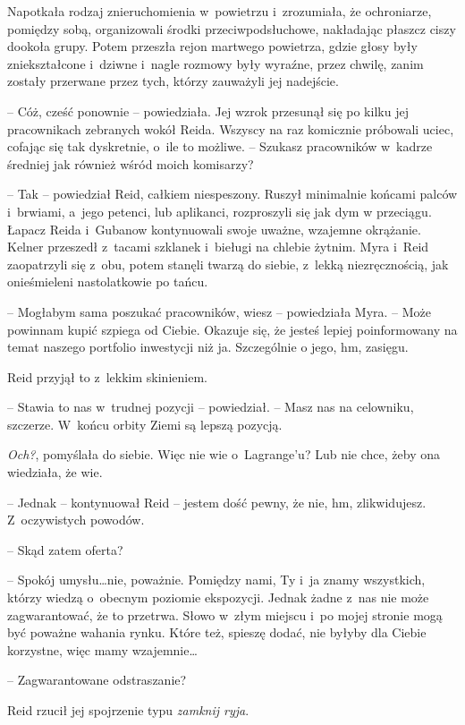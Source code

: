 \documentclass[oneside,polish,11pt,sfheadings]{mwbk}
\begin{document}
Napotkała rodzaj znieruchomienia w~powietrzu i~zrozumiała, że
ochroniarze, pomiędzy sobą, organizowali środki przeciwpodsłuchowe,
nakładając płaszcz ciszy dookoła grupy. Potem przeszła rejon martwego
powietrza, gdzie głosy były zniekształcone i~dziwne i~nagle rozmowy były
wyraźne, przez chwilę, zanim zostały przerwane przez tych, którzy
zauważyli jej nadejście.

-- Cóż, cześć ponownie -- powiedziała. Jej wzrok przesunął się po kilku
jej pracownikach zebranych wokół Reida. Wszyscy na raz komicznie
próbowali uciec, cofając się tak dyskretnie, o~ile to możliwe. -- Szukasz
pracowników w~kadrze średniej jak również wśród moich komisarzy?

-- Tak -- powiedział Reid, całkiem niespeszony. Ruszył minimalnie końcami
palców i~brwiami, a~jego petenci, lub aplikanci, rozproszyli się jak dym
w przeciągu. Łapacz Reida i~Gubanow kontynuowali swoje uważne, wzajemne
okrążanie. Kelner przeszedł z~tacami szklanek i~bieługi na chlebie
żytnim. Myra i~Reid zaopatrzyli się z~obu, potem stanęli twarzą do
siebie, z~lekką niezręcznością, jak onieśmieleni nastolatkowie po tańcu.

-- Mogłabym sama poszukać pracowników, wiesz -- powiedziała Myra. -- Może
powinnam kupić szpiega od Ciebie. Okazuje się, że jesteś lepiej
poinformowany na temat naszego portfolio inwestycji niż ja. Szczególnie
o jego, hm, zasięgu.

Reid przyjął to z~lekkim skinieniem.

-- Stawia to nas w~trudnej pozycji -- powiedział. -- Masz nas na celowniku,
szczerze. W~końcu orbity Ziemi są lepszą pozycją.

\textit{Och?}, pomyślała do siebie. Więc nie wie o~Lagrange'u? Lub nie
chce, żeby ona wiedziała, że wie.

-- Jednak -- kontynuował Reid -- jestem dość pewny, że nie, hm,
zlikwidujesz. Z~oczywistych powodów.

-- Skąd zatem oferta?

-- Spokój umysłu\ldots nie, poważnie. Pomiędzy nami, Ty i~ja znamy
wszystkich, którzy wiedzą o~obecnym poziomie ekspozycji. Jednak żadne z~nas nie może zagwarantować, że to przetrwa. Słowo w~złym miejscu i~po
mojej stronie mogą być poważne wahania rynku. Które też, spieszę dodać,
nie byłyby dla Ciebie korzystne, więc mamy wzajemnie\ldots

-- Zagwarantowane odstraszanie?

Reid rzucił jej spojrzenie typu \textit{zamknij ryja}. 
\end{document}
